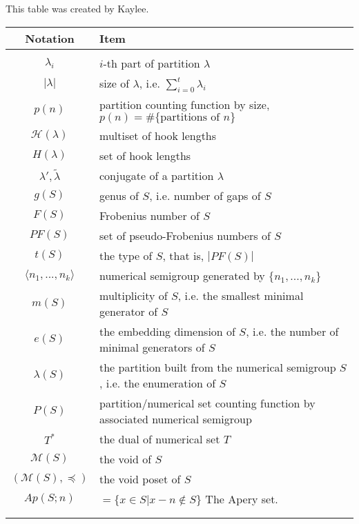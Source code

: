 This table was created by Kaylee. 

\begin{table}[!h]
    \centering
    \begin{tabularx}{\textwidth}{c|X}
        Notation & Item \\
        \hline \\
        $\lambda_i$ & $i$-th part of partition $\lambda$ \\
        $|\lambda|$ & size of $\lambda$, i.e. $\sum_{i=0}^t\lambda_i$ \\
        $p(n)$ & partition counting function by size, $p(n) =  \#\{\text{partitions of }n\}$\\
         $\mathcal{H}(\lambda)$ & multiset of hook lengths \\
         $H(\lambda)$ & set of hook lengths \\
         $\lambda ', \tilde{\lambda}$ & conjugate of a partition $\lambda$ \\
         $g(S)$ & genus of $S$, i.e. number of gaps of $S$ \\
         $F(S)$ & Frobenius number of $S$ \\
         $PF(S)$ & set of pseudo-Frobenius numbers of $S$ \\
         $t(S)$ & the type of $S$, that is, $|PF(S)|$ \\
         $\langle n_1,..., n_k \rangle$ & numerical semigroup generated by $\{n_1, ...,n_k\}$ \\
         $m(S)$ & multiplicity of $S$, i.e. the smallest minimal generator of $S$ \\
         $e(S)$ & the embedding dimension of $S$, i.e. the number of minimal generators of $S$ \\
         $\lambda(S)$ & the partition built from the numerical semigroup $S$, \newline i.e. the enumeration of $S$ \\
         $P(S)$ & partition/numerical set counting function by associated numerical semigroup \\
         $T^*$& the dual of numerical set $T$ \\
         $\mathcal{M}(S)$& the void of $S$ \\
         $(\mathcal{M}(S), \preceq)$& the void poset of $S$ \\
         $Ap(S;n)$ & $= \{ x \in S | x - n \not \in S \}$ The Apery set. \\
         & \\
         & \\
    \end{tabularx}
\end{table}
